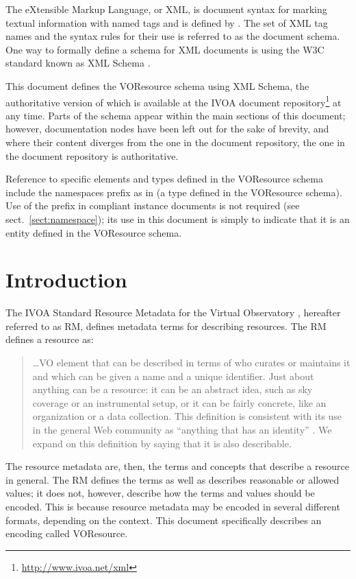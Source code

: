 \documentclass[11pt,a4paper]{ivoa}
\begin{document}
The eXtensible Markup Language, or XML, is document syntax for marking
textual information with named tags and is defined by \citet{std:XML}.
The set of XML tag names and the syntax
rules for their use is referred to as the document schema.  One way to
formally define a schema for XML documents is using the W3C standard
known as XML Schema \citep{std:XSD}.

This document defines the VOResource schema using XML Schema, the
authoritative version of which is available at the IVOA document
repository\footnote{\url{http://www.ivoa.net/xml}} at any time.
Parts of the schema appear within the main sections of this document;
however, documentation nodes have been left out for the sake of brevity,
and where their content diverges from the one in the document
repository, the one in the document repository is authoritative.

Reference to specific elements and types defined in the VOResource
schema include the namespaces prefix  as in
 (a type defined in the VOResource schema).
Use of the  prefix in compliant instance documents is 
not required (see sect.~\ref{sect:namespace}); its use in this
document is simply to indicate that it is an entity defined in the
VOResource schema.

\section{Introduction}

The IVOA Standard Resource Metadata for the Virtual Observatory
\citep{2007ivoa.spec.0302H}, hereafter referred to as RM, defines
metadata terms for describing resources.  The RM defines a resource as: 

\begin{quotation}
\dots VO element that can be described in terms of who curates or
maintains it and which can be given a name and a unique identifier.
Just about anything can be a resource: it can be an abstract idea,
such as sky coverage or an instrumental setup, or it can be fairly
concrete, like an organization or a data collection.  This definition
is consistent with its use in the general Web community as
``anything that has an identity'' \citep{std:RFC2396}.  We
expand on this definition by saying that it is also describable.  
\end{quotation}

The resource metadata are, then, the terms and concepts that describe
a resource in general.  The RM defines the terms as well as describes
reasonable or allowed values; it does not, however, describe how the
terms and values should be encoded.  This is because resource metadata
may be encoded in several different formats, depending on the
context.  This document specifically describes an encoding called
VOResource.  
\end{document}
